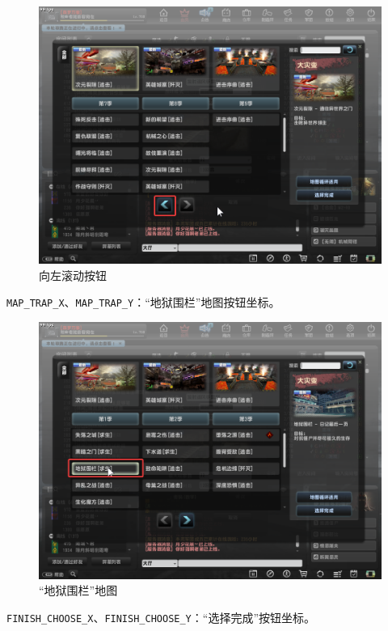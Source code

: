 \begin{figure}[H]
    \Centering
    \includegraphics[width=\textwidth]{docs/assets/left_scroll.png}
    \caption{向左滚动按钮}
\end{figure}

\lstinline{MAP_TRAP_X}、\lstinline{MAP_TRAP_Y}：“地狱围栏”地图按钮坐标。

\begin{figure}[H]
    \Centering
    \includegraphics[width=\textwidth]{docs/assets/map_trap.png}
    \caption{“地狱围栏”地图}
\end{figure}

\lstinline{FINISH_CHOOSE_X}、\lstinline{FINISH_CHOOSE_Y}：“选择完成”按钮坐标。

